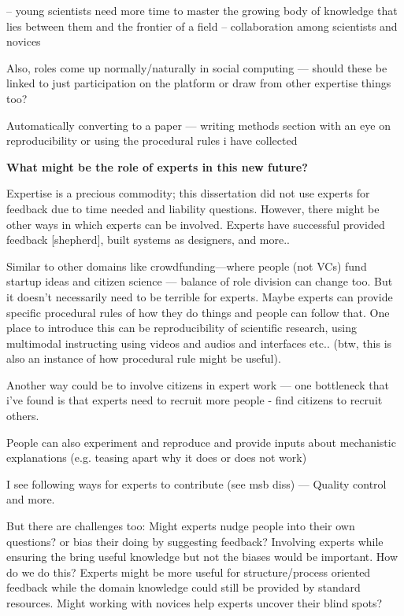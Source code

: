  -- young scientists need more time to master the growing body of knowledge that lies between them and the frontier of a field -- collaboration among scientists and novices

Also, roles come up normally/naturally in social computing — should these be linked to just participation on the platform or draw from other expertise things too?

Automatically converting to a paper — writing methods section with an eye on reproducibility
or using the procedural rules i have collected 

\textbf{What might be the role of experts in this new future?}

Expertise is a precious commodity; this dissertation did not use experts for feedback due to time needed and liability questions. However, there might be other ways in which experts can be involved. Experts have successful provided feedback [shepherd], built systems as designers, and more.. 

Similar to other domains like crowdfunding—where people (not VCs) fund startup ideas  and citizen science — balance of role division can change too. But it doesn’t necessarily need to be terrible for experts. Maybe experts can provide specific procedural rules of how they do things and people can follow that. One place to introduce this can be reproducibility of scientific research, using multimodal instructing using videos and audios and interfaces etc.. (btw, this is also an instance of how procedural rule might be useful).

Another way could be to involve citizens in expert work — one bottleneck that i’ve found is that experts need to recruit more people - find citizens to recruit others. 

People can also experiment and reproduce and provide inputs about mechanistic explanations (e.g. teasing apart why it does or does not work)

I see following ways for experts to contribute (see msb diss) — Quality control  and more.

But there are challenges too: Might experts nudge people into their own questions? or bias their doing by suggesting feedback?
    Involving experts while ensuring the bring useful knowledge but not the biases would be important. How do we do this? Experts might be more useful for structure/process oriented feedback while the domain knowledge could still be provided by standard resources. Might working with novices help experts uncover their blind spots?

